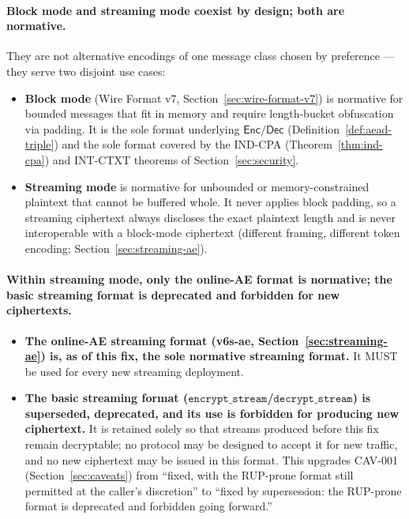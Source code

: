 \documentclass[11pt,a4paper]{article}
\begin{document}
\paragraph{Block mode and streaming mode coexist by design; both are
normative.} They are not alternative encodings of one message class chosen
by preference — they serve two disjoint use cases:
\begin{itemize}
  \item \textbf{Block mode} (Wire Format v7, Section~\ref{sec:wire-format-v7})
        is normative for bounded messages that fit in memory and require
        length-bucket obfuscation via padding. It is the sole format
        underlying $\mathsf{Enc}/\mathsf{Dec}$
        (Definition~\ref{def:aead-triple}) and the sole format covered by
        the IND-CPA (Theorem~\ref{thm:ind-cpa}) and INT-CTXT theorems of
        Section~\ref{sec:security}.
  \item \textbf{Streaming mode} is normative for unbounded or
        memory-constrained plaintext that cannot be buffered whole. It
        never applies block padding, so a streaming ciphertext always
        discloses the exact plaintext length and is never interoperable
        with a block-mode ciphertext (different framing, different token
        encoding; Section~\ref{sec:streaming-ae}).
\end{itemize}

\paragraph{Within streaming mode, only the online-AE format is normative;
the basic streaming format is deprecated and forbidden for new
ciphertexts.}
\begin{itemize}
  \item \textbf{The online-AE streaming format (v6s-ae,
        Section~\ref{sec:streaming-ae}) is, as of this fix, the sole
        normative streaming format.} It MUST be used for every new
        streaming deployment.
  \item \textbf{The basic streaming format
        ($\texttt{encrypt\_stream}$/$\texttt{decrypt\_stream}$) is
        superseded, deprecated, and its use is forbidden for producing new
        ciphertext.} It is retained solely so that streams produced before
        this fix remain decryptable; no protocol may be designed to accept
        it for new traffic, and no new ciphertext may be issued in this
        format. This upgrades CAV-001 (Section~\ref{sec:caveats}) from
        ``fixed, with the RUP-prone format still permitted at the caller's
        discretion'' to ``fixed by supersession: the RUP-prone format is
        deprecated and forbidden going forward.''
\end{itemize}
\end{document}
